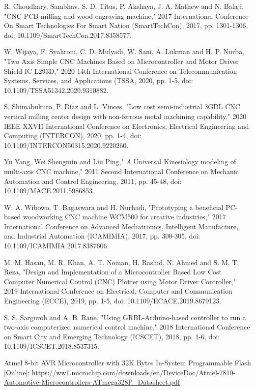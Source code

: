 \documentclass[conference]{IEEEtran}
\begin{document}
\begin{thebibliography}{00}
R. Choudhary, Sambhav, S. D. Titus, P. Akshaya, J. A. Mathew and N. Balaji, "CNC PCB milling and wood engraving machine," 2017 International Conference On Smart Technologies For Smart Nation (SmartTechCon), 2017, pp. 1301-1306, doi: 10.1109/SmartTechCon.2017.8358577.

W. Wijaya, F. Syahroni, C. D. Mulyadi, W. Sani, A. Lukman and H. P. Nurba, "Two Axis Simple CNC Machines Based on Microcontroller and Motor Driver Shield IC L293D," 2020 14th International Conference on Telecommunication Systems, Services, and Applications (TSSA, 2020, pp. 1-5, doi: 10.1109/TSSA51342.2020.9310882.

S. Shimabukuro, P. Díaz and L. Vinces, "Low cost semi-industrial 3GDL CNC vertical milling center design with non-ferrous metal machining capability," 2020 IEEE XXVII International Conference on Electronics, Electrical Engineering and Computing (INTERCON), 2020, pp. 1-4, doi: 10.1109/INTERCON50315.2020.9220260.

Yu Yang, Wei Shengmin and Liu Ping," $A$ Universal Kinesiology modeling of multi-axis CNC machine," 2011 Second International Conference on Mechanic Automation and Control Engineering, 2011, pp. 45-48, doi: 10.1109/MACE.2011.5986853.

W. A. Wibowo, T. Bagaswara and H. Nurhadi, "Prototyping a beneficial PC-based woodworking CNC machine WCM500 for creative industries," 2017 International Conference on Advanced Mechatronics, Intelligent Manufacture, and Industrial Automation (ICAMIMIA), 2017, pp. 300-305, doi: 10.1109/ICAMIMIA.2017.8387606.

M. M. Hasan, M. R. Khan, A. T. Noman, H. Rashid, N. Ahmed and S. M. T. Reza, "Design and Implementation of a Microcontroller Based Low Cost Computer Numerical Control (CNC) Plotter using Motor Driver Controller," 2019 International Conference on Electrical, Computer and Communication Engineering (ECCE), 2019, pp. 1-5, doi: 10.1109/ECACE.2019.8679123.

S. S. Sarguroh and A. B. Rane, "Using GRBL-Arduino-based controller to run a two-axis computerized numerical control machine," 2018 International Conference on Smart City and Emerging Technology (ICSCET), 2018, pp. 1-6, doi: 10.1109/ICSCET.2018.8537315.

 Atmel 8-bit AVR Microcontroller with 32K Bytes In-System
Programmable Flash [Online]: \url{https://ww1.microchip.com/downloads/en/DeviceDoc/Atmel-7810-Automotive-Microcontrollers-ATmega328P_Datasheet.pdf}


\end{thebibliography}
\end{document}
